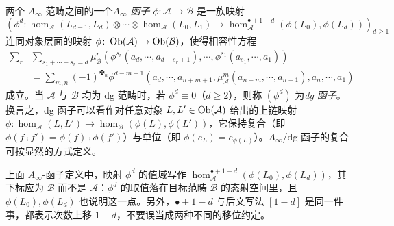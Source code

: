 \begin{dfn}
两个 $A_{\infty}$-范畴之间的一个\emph{$A_{\infty}$-函子} $\phi:\mathcal{A}\rightarrow\mathcal{B}$ 是一族映射 \[
    \left(\phi^d\colon\hom_{\mathcal{A}} (L_{d-1},L_d)\otimes\dotsb\otimes\hom_{\mathcal{A}} (L_0,L_1)\to\hom_{\mathcal{A}}^{\bullet +1-d} (\phi(L_0),\phi(L_d))\right)_{d\geq 1}
\] 连同对象层面的映射 $\phi\colon\operatorname{Ob} (\mathcal{A})\to\operatorname{Ob} (\mathcal{B})$，使得相容性方程
\begin{align*}
    \sum_r&\sum_{s_1+\dotsb+s_r=d}\mu_{\mathcal{B}}^r (\phi^{s_r}(a_d,\dotsb,a_{d-s_r+1}),\dotsb,\phi^{s_1} (a_{s_1},\dotsb, a_1))\\
    &=\sum_{m,n}(-1)^{\maltese_n}\phi^{d-m+1}(a_d,\dotsb, a_{n+m+1},\mu_{\mathcal{A}}^m (a_{n+m},\dotsb, a_{n+1}),a_n,\dotsb, a_1)
\end{align*}
成立。当 $\mathcal{A}$ 与 $\mathcal{B}$ 均为 dg 范畴时，若 $\phi^d\equiv 0$（$d\geq 2$），则称 $(\phi^d)$ 为\emph{dg 函子}。换言之，dg 函子可以看作对任意对象 $L,L'\in\operatorname{Ob}(\mathcal{A})$ 给出的上链映射 $\phi:\hom_{\mathcal{A}}(L,L')\rightarrow\hom_{\mathcal{B}}(\phi(L),\phi(L'))$，它保持复合（即 $\phi(f\comp f')=\phi(f)\comp \phi(f')$）与单位（即 $\phi(e_L)=e_{\phi(L)}$）。$A_{\infty}$/dg 函子的复合可按显然的方式定义。
\end{dfn}

\begin{yizhu}
上面 $A_{\infty}$-函子定义中，映射 $\phi^d$ 的值域写作 $\hom_{\mathcal{A}}^{\bullet +1-d} (\phi(L_0),\phi(L_d))$，其下标应为 $\mathcal{B}$ 而不是 $\mathcal{A}$：$\phi^d$ 的取值落在目标范畴 $\mathcal{B}$ 的态射空间里，且 $\phi(L_0),\phi(L_d)$ 也说明这一点。另外，$\bullet+1-d$ 与后文写法 $[1-d]$ 是同一件事，都表示次数上移 $1-d$，不要误当成两种不同的移位约定。
\end{yizhu}


